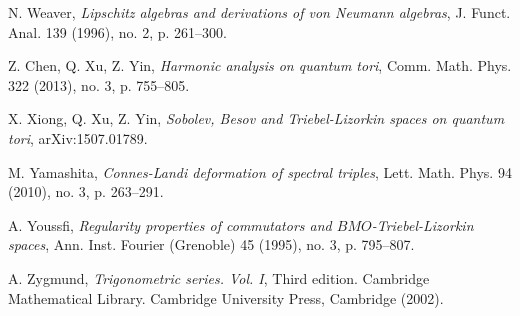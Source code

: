 \documentclass[10pt]{amsart}
\theoremstyle{remark}
\theoremstyle{definition}
\begin{document}
\begin{thebibliography}{100}
 N. Weaver, \emph{Lipschitz algebras and derivations of von Neumann algebras}, J. Funct. Anal. 139 (1996), no. 2, p. 261--300. 

 Z. Chen, Q. Xu, Z. Yin, \emph{Harmonic analysis on quantum tori}, Comm. Math. Phys. 322 (2013), no. 3, p. 755--805.
 
 X. Xiong, Q. Xu, Z. Yin, \emph{Sobolev, Besov and Triebel-Lizorkin spaces on quantum tori}, arXiv:1507.01789.

 M. Yamashita, \emph{Connes-Landi deformation of spectral triples}, Lett. Math. Phys. 94 (2010), no. 3, p. 263--291. 

 A. Youssfi, \emph{Regularity properties of commutators and $BMO$-Triebel-Lizorkin spaces}, Ann. Inst. Fourier (Grenoble) 45 (1995), no. 3, p. 795--807.

 A. Zygmund, \emph{Trigonometric series. Vol. I}, Third edition. Cambridge Mathematical Library. Cambridge University Press, Cambridge (2002).

\end{thebibliography}
\end{document}
